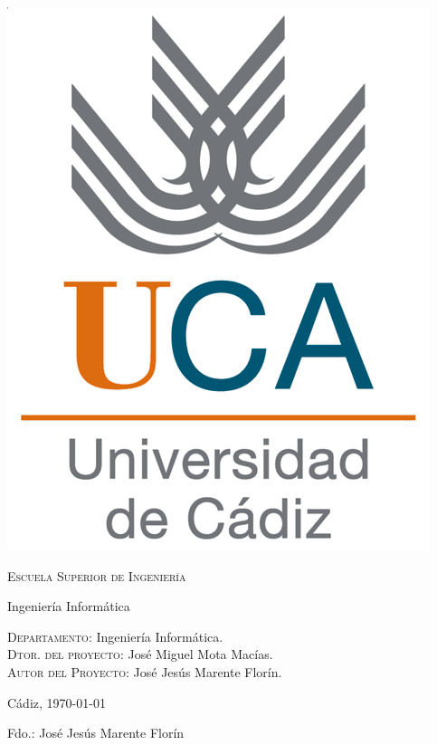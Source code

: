 {
  \thispagestyle{empty}
  \centering
  \includegraphics[width=.2\textwidth]{0_inicio/logo_uca.png}

  \bigskip
  \bigskip
  \bigskip

  \begin{changemargin}{2em}{2em}

    \begin{center}
      {\Huge \textsc{\nohyphens{Escuela Superior de Ingeniería}}}

      \bigskip
      \bigskip

      {\huge \nohyphens{Ingeniería Informática}}

      \bigskip
      \bigskip
      \bigskip
      \bigskip

      \begin{doublespace}
        {\LARGE \nohyphens{\nombreProyecto}}
      \end{doublespace}


      \bigskip
      \bigskip
      \bigskip
      \bigskip

    \end{center}
  \end{changemargin}
  \begin{changemargin}{2em}{1em}
  \begin{flushleft}
    \Large

    \textsc{Departamento}: \nohyphens{Ingeniería Informática.} \\
    \textsc{Dtor. del proyecto}: \nohyphens{José Miguel Mota Macías.} \\
    \textsc{Autor del Proyecto}: \nohyphens{José Jesús Marente Florín}. \\
  \end{flushleft}

  \end{changemargin}

  \bigskip
  \bigskip
  \bigskip

  \begin{flushright}
    \large
    Cádiz, \today

    \bigskip
    \bigskip
    \bigskip
    \bigskip
    \bigskip
    \bigskip

    Fdo.: José Jesús Marente Florín

  \end{flushright}

}



